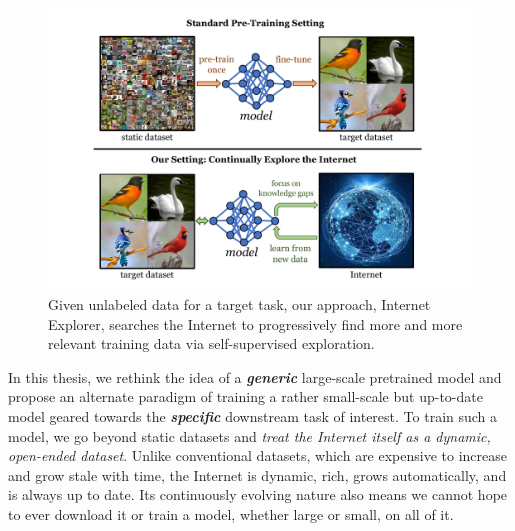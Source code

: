
\begin{figure}[t]
    \centering
    \includegraphics[width=0.8\linewidth]{figures/teaser2.pdf}
    \caption{Given unlabeled data for a target task, our approach, Internet Explorer, searches the Internet to progressively find more and more relevant training data via self-supervised exploration.}
    \label{fig:teaser}
    \vspace{-0.15in}
\end{figure}

In this thesis, we rethink the idea of a \textit{\textbf{generic}} large-scale pretrained model and propose an alternate paradigm of training a rather small-scale but up-to-date model geared towards the \textit{\textbf{specific}} downstream task of interest. To train such a model, we go beyond static datasets and \textit{treat the Internet itself as a dynamic, open-ended dataset}. Unlike conventional datasets, which are expensive to increase and grow stale with time,
the Internet is dynamic, rich, grows automatically, and is always up to date.
Its continuously evolving nature also means we cannot hope to ever download it or train a model, whether large or small, on all of it.

